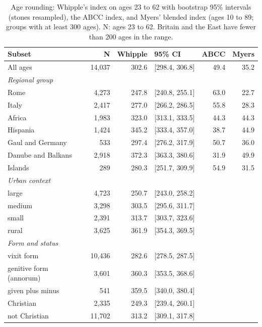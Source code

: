 \documentclass[11pt,a4paper]{article}
\begin{document}
\begin{table}[tbp]\centering\small\caption{Age rounding: Whipple's index on ages 23 to 62 with bootstrap 95\% intervals (stones resampled), the ABCC index, and Myers' blended index (ages 10 to 89; groups with at least 300 ages). N: ages 23 to 62. Britain and the East have fewer than 200 ages in the range.}\label{tab:whipple}\begin{tabular}{lrrlrr}\toprule Subset & N & Whipple & 95\% CI & ABCC & Myers\\\midrule
All ages & 14,037 & 302.6 & [298.4, 306.8] & 49.4 & 35.2\\
\multicolumn{6}{l}{\textit{Regional group}}\\
\quad Rome & 4,273 & 247.8 & [240.8, 255.1] & 63.0 & 22.7\\
\quad Italy & 2,417 & 277.0 & [266.2, 286.5] & 55.8 & 28.3\\
\quad Africa & 1,983 & 323.0 & [313.1, 333.5] & 44.3 & 44.3\\
\quad Hispania & 1,424 & 345.2 & [333.4, 357.0] & 38.7 & 44.9\\
\quad Gaul and Germany & 533 & 297.4 & [276.2, 317.9] & 50.7 & 36.0\\
\quad Danube and Balkans & 2,918 & 372.3 & [363.3, 380.6] & 31.9 & 49.9\\
\quad Islands & 289 & 280.3 & [251.7, 309.9] & 54.9 & 31.5\\
\multicolumn{6}{l}{\textit{Urban context}}\\
\quad large & 4,723 & 250.7 & [243.0, 258.2] & & \\
\quad medium & 3,298 & 303.5 & [295.6, 311.7] & & \\
\quad small & 2,391 & 313.7 & [303.7, 323.6] & & \\
\quad rural & 3,625 & 361.9 & [354.3, 369.5] & & \\
\multicolumn{6}{l}{\textit{Form and status}}\\
\quad vixit form & 10,436 & 282.6 & [278.5, 287.5] & & \\
\quad genitive form (annorum) & 3,601 & 360.3 & [353.5, 368.6] & & \\
\quad given plus minus & 541 & 359.5 & [340.0, 380.4] & & \\
\quad Christian & 2,335 & 249.3 & [239.4, 260.1] & & \\
\quad not Christian & 11,702 & 313.2 & [309.1, 317.8] & & \\
\bottomrule\end{tabular}\end{table}
\end{document}
